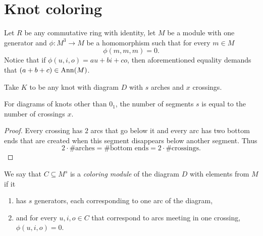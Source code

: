\section{Knot coloring}

Let $R$ be any commutative ring with identity, let $M$ be a module with one generator and $\phi:M^3\to M$ be a homomorphism such that for every $m\in M$
\begin{equation}\label{phi allows for trivial colorings}
  \phi(m,m,m)=0.
\end{equation}
Notice that if $\phi(u,i,o)=au+bi+co$, then aforementioned equality demands that $(a+b+c)\in \operatorname{Ann}(M)$.

Take $K$ to be any knot with diagram $D$ with $s$ arches and $x$ crossings.

\begin{lemma}
  For diagrams of knots other than $0_1$, the number of segments $s$ is equal to the number of crossings $x$.
\end{lemma}

\begin{proof}
  Every crossing has $2$ arcs that go below it and every arc has two bottom ends that are created when this segment disappears below another segment. Thus 
  $$2\cdot \#\text{arches} = \#\text{bottom ends} = 2\cdot \#\text{crossings}.$$
\end{proof}

\begin{definition}\label{coloring definition primitive}
  We say that $C\subseteq M^s$ is a \emph{coloring module} of the diagram $D$ with elements from $M$ if it 
  \begin{enumerate}
    \item {\color{orange}has $s$ generators, each corresponding to one arc of the diagram}, 
    \item and for every $u, i, o\in C$ that correspond to arcs meeting in one crossing, $\phi(u,i,o)=0$.
  \end{enumerate}
  \begin{center}
  \end{center}
\end{definition}

